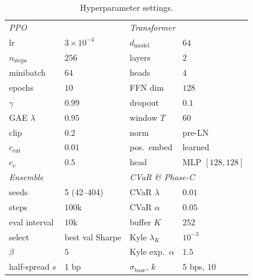 \documentclass[conference]{IEEEtran}
\begin{document}
\begin{table}[t]
  \centering
  \caption{Hyperparameter settings.}
  \label{tab:hyper}
  \footnotesize
  \begin{tabular}{ll@{\hskip 1.5em}ll}
    \toprule
    \multicolumn{2}{l}{\textit{PPO}} & \multicolumn{2}{l}{\textit{Transformer}} \\
    lr                & $3{\times}10^{-4}$              & $d_{\text{model}}$   & $64$ \\
    $n_{\text{steps}}$& $256$                           & layers               & $2$ \\
    minibatch         & $64$                            & heads                & $4$ \\
    epochs            & $10$                            & FFN dim              & $128$ \\
    $\gamma$          & $0.99$                          & dropout              & $0.1$ \\
    GAE $\lambda$     & $0.95$                          & window $T$           & $60$ \\
    clip              & $0.2$                           & norm                 & pre-LN \\
    $c_{\text{ent}}$  & $0.01$                          & pos.\ embed          & learned \\
    $c_v$             & $0.5$                           & head                 & MLP $[128,128]$ \\
    \midrule
    \multicolumn{2}{l}{\textit{Ensemble}} & \multicolumn{2}{l}{\textit{CVaR \& Phase-C}} \\
    seeds             & 5 (42--404)                     & CVaR $\lambda$       & $0.01$ \\
    steps             & $100$k                          & CVaR $\alpha$        & $0.05$ \\
    eval interval     & $10$k                           & buffer $K$           & $252$ \\
    select            & best val Sharpe                 & Kyle $\lambda_K$     & $10^{-3}$ \\
    $\beta$           & $5$                             & Kyle exp.\ $\alpha$  & $1.5$ \\
    half-spread $s$   & $1$ bp                          & $\sigma_{\text{base}}$, $k$ & $5$ bps, $10$ \\
    \bottomrule
  \end{tabular}
\end{table}
\end{document}
